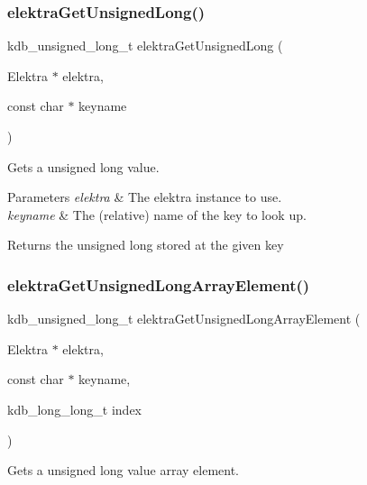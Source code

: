 \subsubsection{\texorpdfstring{elektra\+Get\+Unsigned\+Long()}{elektraGetUnsignedLong()}}
{\footnotesize\ttfamily kdb\+\_\+unsigned\+\_\+long\+\_\+t elektra\+Get\+Unsigned\+Long (\begin{DoxyParamCaption}\item[{Elektra $\ast$}]{elektra,  }\item[{const char $\ast$}]{keyname }\end{DoxyParamCaption})}



Gets a unsigned long value. 


\begin{DoxyParams}{Parameters}
{\em elektra} & The elektra instance to use. \\
\hline
{\em keyname} & The (relative) name of the key to look up. \\
\hline
\end{DoxyParams}
\begin{DoxyReturn}{Returns}
the unsigned long stored at the given key 
\end{DoxyReturn}
\mbox{\label{group__highlevel_ga8eb3597a96134c11f5d04a4613c44b92}} 
\subsubsection{\texorpdfstring{elektra\+Get\+Unsigned\+Long\+Array\+Element()}{elektraGetUnsignedLongArrayElement()}}
{\footnotesize\ttfamily kdb\+\_\+unsigned\+\_\+long\+\_\+t elektra\+Get\+Unsigned\+Long\+Array\+Element (\begin{DoxyParamCaption}\item[{Elektra $\ast$}]{elektra,  }\item[{const char $\ast$}]{keyname,  }\item[{kdb\+\_\+long\+\_\+long\+\_\+t}]{index }\end{DoxyParamCaption})}



Gets a unsigned long value array element. 


